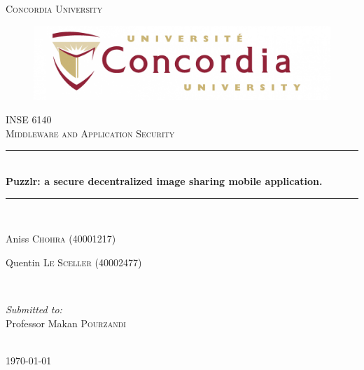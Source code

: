 \begin{titlepage}
 \newcommand{\HRule}{\rule{\linewidth}{0.5mm}}
 \center
 
 
 \textsc{\LARGE Concordia University}\\[1.5cm]
 \begin{figure}[h]
 \centering
 \includegraphics[width=12cm]{concordia}
 \end{figure}

 \textsc{\large INSE 6140}\\[0.5cm]
 \textsc{\large Middleware and Application Security}
 
 
 \HRule \\[0.4cm]
 {
  \Huge \bfseries Puzzlr: a secure decentralized image sharing mobile application.
 }
 \HRule \\[1.5cm]
 
 
 \begin{minipage}{1\textwidth}
  \begin{flushleft}
   \center Aniss \textsc{Chohra} (40001217)
  \end{flushleft}
  \begin{flushleft}
   \center Quentin \textsc{Le Sceller} (40002477)
  \end{flushleft}


 \end{minipage}
 ~
 \newline
 \newline
 
 
 \begin{minipage}{1\textwidth}
 
  \begin{flushleft}
   \emph{Submitted to:} \\
   Professor Makan \textsc{Pourzandi}
  \end{flushleft}

 \end{minipage}\\[4cm]
 
 
 {\large \today}\\[3cm]
 
 \vfill


\end{titlepage}
